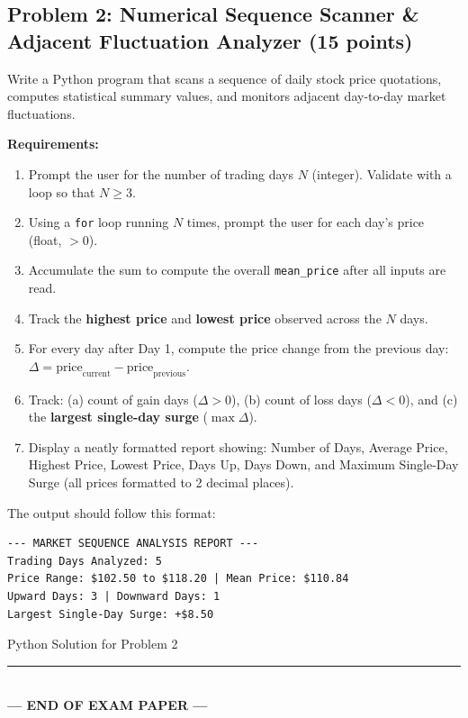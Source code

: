 \documentclass[11pt,a4paper]{article}
\begin{document}

\subsection*{Problem 2: Numerical Sequence Scanner \& Adjacent Fluctuation Analyzer (15 points)}
Write a Python program that scans a sequence of daily stock price quotations, computes statistical summary values, and monitors adjacent day-to-day market fluctuations.

\textbf{Requirements:}
\begin{enumerate}[leftmargin=2em,label=\arabic*.,itemsep=1pt]
  \item Prompt the user for the number of trading days $N$ (integer). Validate with a loop so that $N \ge 3$.
  \item Using a \texttt{for} loop running $N$ times, prompt the user for each day's price (float, $> 0$).
  \item Accumulate the sum to compute the overall \texttt{mean\_price} after all inputs are read.
  \item Track the \textbf{highest price} and \textbf{lowest price} observed across the $N$ days.
  \item For every day after Day 1, compute the price change from the previous day: $\Delta = \text{price}_{\text{current}} - \text{price}_{\text{previous}}$.
  \item Track: (a) count of gain days ($\Delta > 0$), (b) count of loss days ($\Delta < 0$), and (c) the \textbf{largest single-day surge} ($\max \Delta$).
  \item Display a neatly formatted report showing: Number of Days, Average Price, Highest Price, Lowest Price, Days Up, Days Down, and Maximum Single-Day Surge (all prices formatted to 2 decimal places).
\end{enumerate}

The output should follow this format:
\begin{lstlisting}
--- MARKET SEQUENCE ANALYSIS REPORT ---
Trading Days Analyzed: 5
Price Range: $102.50 to $118.20 | Mean Price: $110.84
Upward Days: 3 | Downward Days: 1
Largest Single-Day Surge: +$8.50
\end{lstlisting}

\begin{answerbox}[height=15.2cm]{Python Solution for Problem 2}
\end{answerbox}

\vfill
\begin{center}
  \rule{0.5\textwidth}{0.4pt}\\[1mm]
  \textbf{\color{primaryblue}--- END OF EXAM PAPER ---}
\end{center}
\end{document}
